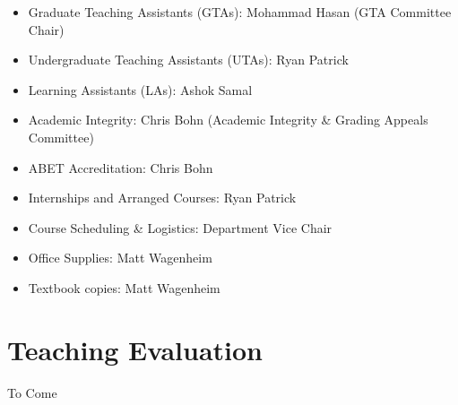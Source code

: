 \documentclass[12pt]{scrartcl}
\begin{document}
\begin{itemize}
  \item Graduate Teaching Assistants (GTAs): Mohammad Hasan (GTA Committee Chair)
  \item Undergraduate Teaching Assistants (UTAs): Ryan Patrick
  \item Learning Assistants (LAs): Ashok Samal
  \item Academic Integrity: Chris Bohn (Academic Integrity \& Grading Appeals Committee)
  \item ABET Accreditation: Chris Bohn
  \item Internships and Arranged Courses: Ryan Patrick
  \item Course Scheduling \& Logistics: Department Vice Chair
  \item Office Supplies: Matt Wagenheim
  \item Textbook copies: Matt Wagenheim
\end{itemize}

\section{Teaching Evaluation}

To Come
\end{document}
